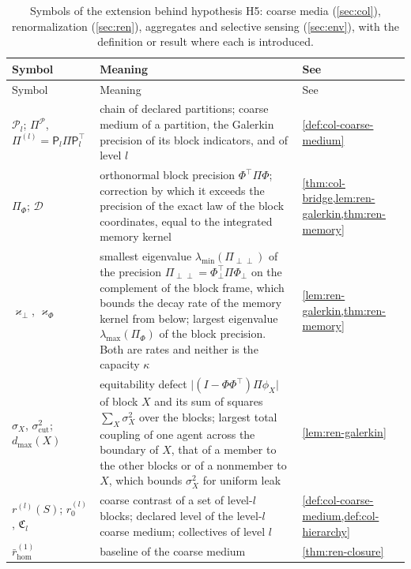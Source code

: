 \begingroup
\small
\setlength{\tabcolsep}{4pt}
\begin{longtable}{@{}>{\raggedright\arraybackslash}p{}>{\raggedright\arraybackslash}p{}>{\raggedright\arraybackslash}p{}@{}}
\caption{Symbols of the extension behind hypothesis H5: coarse media (\cref{sec:col}), renormalization (\cref{sec:ren}), aggregates and selective sensing (\cref{sec:env}), with the definition or result where each is introduced.}\label{tab:not-coarse}\\
\toprule
Symbol & Meaning & See\\
\midrule
\endfirsthead
\toprule
Symbol & Meaning & See\\
\midrule
\endhead
\bottomrule
\endfoot
$\mathcal P_l$; $\Pi^{\mathcal P}$, $\Pi^{(l)}=\mathsf P_l\Pi\mathsf P_l^\top$ & chain of declared partitions; coarse medium of a partition, the Galerkin precision of its block indicators, and of level $l$ & \cref{def:col-coarse-medium}\\
$\Pi_\Phi$; $\mathcal D$ & orthonormal block precision $\Phi^\top\Pi\Phi$; correction by which it exceeds the precision of the exact law of the block coordinates, equal to the integrated memory kernel & \cref{thm:col-bridge,lem:ren-galerkin,thm:ren-memory}\\
$\varkappa_\perp$, $\varkappa_\Phi$ & smallest eigenvalue $\lambda_{\min}(\Pi_{\perp\perp})$ of the precision $\Pi_{\perp\perp}=\Phi_\perp^\top\Pi\Phi_\perp$ on the complement of the block frame, which bounds the decay rate of the memory kernel from below; largest eigenvalue $\lambda_{\max}(\Pi_\Phi)$ of the block precision. Both are rates and neither is the capacity $\kappa$ & \cref{lem:ren-galerkin,thm:ren-memory}\\
$\sigma_X$, $\sigma^2_{\mathrm{cut}}$; $d_{\max}(X)$ & equitability defect $\lvert(I-\Phi\Phi^\top)\Pi\phi_X\rvert$ of block $X$ and its sum of squares $\sum_X\sigma_X^2$ over the blocks; largest total coupling of one agent across the boundary of $X$, that of a member to the other blocks or of a nonmember to $X$, which bounds $\sigma_X^2$ for uniform leak & \cref{lem:ren-galerkin}\\
$r^{(l)}(S)$; $r^{(l)}_0$, $\mathfrak C_l$ & coarse contrast of a set of level-$l$ blocks; declared level of the level-$l$ coarse medium; collectives of level $l$ & \cref{def:col-coarse-medium,def:col-hierarchy}\\
$\bar r^{(1)}_{\mathrm{hom}}$ & baseline of the coarse medium & \cref{thm:ren-closure}\\

\end{longtable}
